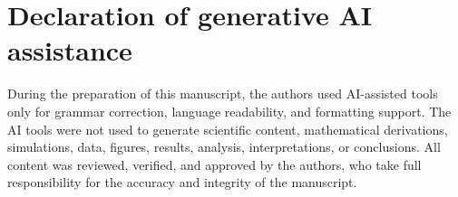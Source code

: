 \section*{Declaration of generative AI assistance}
During the preparation of this manuscript, the authors used AI-assisted tools only for grammar correction, language readability, and formatting support. The AI tools were not used to generate scientific content, mathematical derivations, simulations, data, figures, results, analysis, interpretations, or conclusions. All content was reviewed, verified, and approved by the authors, who take full responsibility for the accuracy and integrity of the manuscript.
